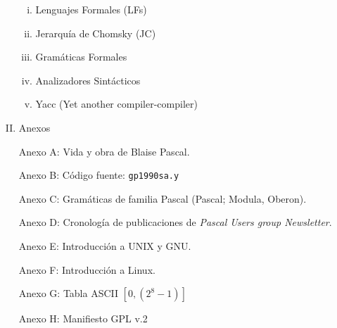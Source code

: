 \begin{enumerate}[I.]
{\begin{enumerate}[i.]

\item Lenguajes Formales (LFs)

\item Jerarquía de Chomsky (JC)

\item Gramáticas Formales

\item Analizadores Sintácticos

\item Yacc (Yet another compiler-compiler)

\end{enumerate}



}
% 
% 
% 
\item Anexos
{

Anexo A: Vida y obra de Blaise Pascal.

Anexo B: Código fuente: \texttt{gp1990sa.y}

Anexo C: Gramáticas de familia Pascal (Pascal; Modula, Oberon).

Anexo D: Cronología de publicaciones de \textit{Pascal Users group Newsletter}.

Anexo E: Introducción a UNIX y GNU.

Anexo F: Introducción a Linux.

Anexo G: Tabla ASCII  $[0, (2^8 - 1)]$

Anexo H: Manifiesto GPL v.2

}
\end{enumerate}
